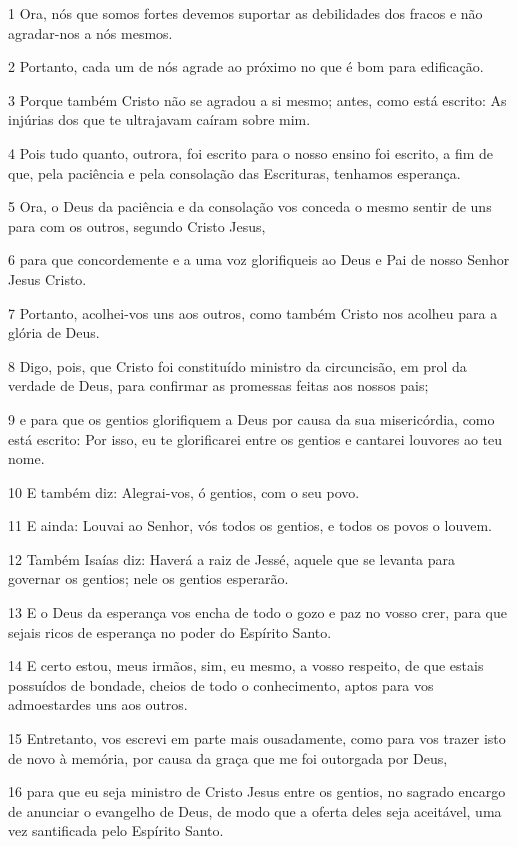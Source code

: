 \par 1 Ora, nós que somos fortes devemos suportar as debilidades dos fracos e não agradar-nos a nós mesmos.
\par 2 Portanto, cada um de nós agrade ao próximo no que é bom para edificação.
\par 3 Porque também Cristo não se agradou a si mesmo; antes, como está escrito: As injúrias dos que te ultrajavam caíram sobre mim.
\par 4 Pois tudo quanto, outrora, foi escrito para o nosso ensino foi escrito, a fim de que, pela paciência e pela consolação das Escrituras, tenhamos esperança.
\par 5 Ora, o Deus da paciência e da consolação vos conceda o mesmo sentir de uns para com os outros, segundo Cristo Jesus,
\par 6 para que concordemente e a uma voz glorifiqueis ao Deus e Pai de nosso Senhor Jesus Cristo.
\par 7 Portanto, acolhei-vos uns aos outros, como também Cristo nos acolheu para a glória de Deus.
\par 8 Digo, pois, que Cristo foi constituído ministro da circuncisão, em prol da verdade de Deus, para confirmar as promessas feitas aos nossos pais;
\par 9 e para que os gentios glorifiquem a Deus por causa da sua misericórdia, como está escrito: Por isso, eu te glorificarei entre os gentios e cantarei louvores ao teu nome.
\par 10 E também diz: Alegrai-vos, ó gentios, com o seu povo.
\par 11 E ainda: Louvai ao Senhor, vós todos os gentios, e todos os povos o louvem.
\par 12 Também Isaías diz: Haverá a raiz de Jessé, aquele que se levanta para governar os gentios; nele os gentios esperarão.
\par 13 E o Deus da esperança vos encha de todo o gozo e paz no vosso crer, para que sejais ricos de esperança no poder do Espírito Santo.
\par 14 E certo estou, meus irmãos, sim, eu mesmo, a vosso respeito, de que estais possuídos de bondade, cheios de todo o conhecimento, aptos para vos admoestardes uns aos outros.
\par 15 Entretanto, vos escrevi em parte mais ousadamente, como para vos trazer isto de novo à memória, por causa da graça que me foi outorgada por Deus,
\par 16 para que eu seja ministro de Cristo Jesus entre os gentios, no sagrado encargo de anunciar o evangelho de Deus, de modo que a oferta deles seja aceitável, uma vez santificada pelo Espírito Santo.
